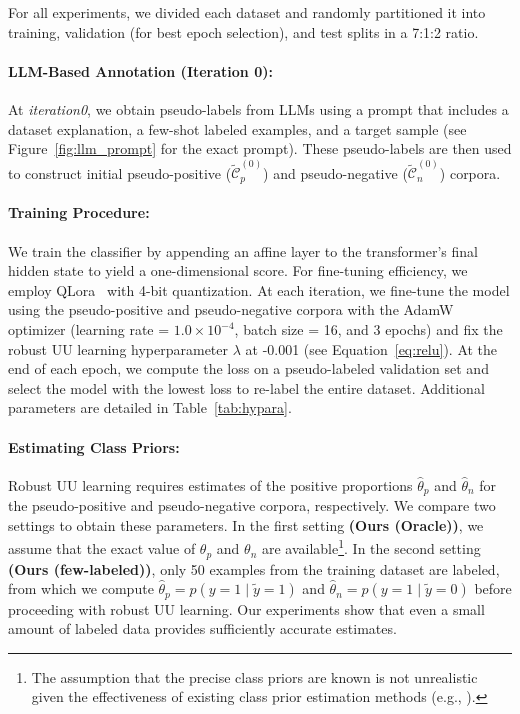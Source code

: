 For all experiments, we divided each dataset and randomly partitioned it into training, validation (for best epoch selection), and test splits in a 7:1:2 ratio. 

\paragraph{LLM-Based Annotation (Iteration 0):}
At \emph{iteration0}, we obtain pseudo-labels from LLMs using a prompt that includes a dataset explanation, a few-shot labeled examples, and a target sample (see Figure~\ref{fig:llm_prompt} for the exact prompt). These pseudo-labels are then used to construct initial pseudo-positive ($\widetilde{\mathcal{C}}_p^{(0)}$) and pseudo-negative ($\widetilde{\mathcal{C}}_n^{(0)}$) corpora.

\paragraph{Training Procedure:}
We train the classifier by appending an affine layer to the transformer’s final hidden state to yield a one-dimensional score. For fine-tuning efficiency, we employ QLora~\citep{Dettmers2023-vs} with 4-bit quantization. At each iteration, we fine-tune the model using the pseudo-positive and pseudo-negative corpora with the AdamW optimizer (learning rate = $1.0 \times 10^{-4}$, batch size = 16, and 3 epochs) and fix the robust UU learning hyperparameter $\lambda$ at -0.001 (see Equation~\eqref{eq:relu}).  At the end of each epoch, we compute the loss on a pseudo-labeled validation set and select the model with the lowest loss to re-label the entire dataset. Additional parameters are detailed in Table~\ref{tab:hypara}.

\paragraph{Estimating Class Priors:}
Robust UU learning requires estimates of the positive proportions $\hat{\theta}_{p}$ and $\hat{\theta}_{n}$ for the pseudo-positive and pseudo-negative corpora, respectively. We compare two settings to obtain these parameters. In the first setting \textbf{(Ours (Oracle))}, we assume that the exact value of $\theta_{p}$ and $\theta_{n}$ are available\footnote{The assumption that the precise class priors are known is not unrealistic given the effectiveness of existing class prior estimation methods (e.g., \citep{Scott2013-hz, Menon2015-hb, Liu2016-tx, Bekker2020-sa}).}. In the second setting \textbf{(Ours (few-labeled))}, only 50 examples from the training dataset are labeled, from which we compute $\hat{\theta}_p = p(y = 1 \mid \tilde{y} = 1)$ and $\hat{\theta}_n = p(y = 1 \mid \tilde{y} = 0)$ before proceeding with robust UU learning. Our experiments show that even a small amount of labeled data provides sufficiently accurate estimates.

